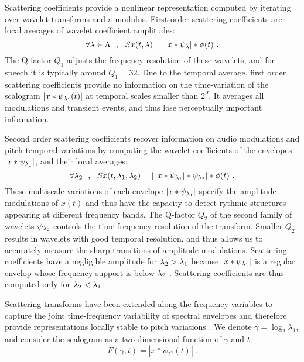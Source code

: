 Scattering coefficients provide a nonlinear representation 
computed by 
iterating over wavelet transforms and a modulus. 
First order scattering coefficients
are local averages of wavelet coefficient amplitudes:
\[
\forall {\lambda} \in {\Lambda}~~,~~S x(t,{\lambda}) = |\, x \ast \psi_{\lambda}| \ast \phi(t)~. 
\]
The Q-factor $Q_1$ adjusts the frequency resolution of 
these wavelets, and for speech it is typically around $Q_1=32$.
 Due to the temporal average, first order scattering coefficients 
provide no information on the time-variation of the scalogram
$|x \ast \psi_{{\lambda}_1} (t)|$ at temporal scales smaller than $2^J$. 
It averages all modulations and 
transient events, and thus lose perceptually important information.
 
Second order scattering coefficients recover information on
audio modulations and pitch temporal variations by computing
the wavelet coefficients of the envelopes $|x \ast \psi_{{\lambda}_1}|$, and their
local averages:
\[
\forall {\lambda}_2~~,~~
S x(t,{\lambda}_1,{\lambda}_2) = ||\, x \ast \psi_{{\lambda}_1}| \ast \psi_{{\lambda}_2}| \ast \phi(t)~ .
\]
These multiscale variations of each envelope $|x \ast \psi_{{\lambda}_1}|$ 
specify the amplitude modulations of $x(t)$ \cite{deepscatt} and 
thus have the capacity to detect rythmic structures appearing at different 
frequency bands. 
The Q-factor $Q_2$ of the second family of wavelets $\psi_{{\lambda}_2}$ 
controls the time-frequency resolution of the transform. Smaller $Q_2$ 
results in wavelets with good temporal resolution, and thus
allows us to accurately measure the sharp transitions of
amplitude modulations. 
Scattering coefficients have a negligible amplitude for
${\lambda}_2 > {\lambda}_1$ because $|x \ast \psi_{{\lambda}_1}|$ is a regular envelop
whose frequency support is below ${\lambda}_2$ \cite{pami}. 
Scattering coefficients are thus computed only for ${\lambda}_2 < {\lambda}_1$. 

%
%
%
%
Scattering transforms have been extended along the frequency
variables to capture the joint time-frequency 
variability of spectral envelopes and therefore provide 
 representations locally stable to pitch variations \cite{deepscatt}. 
We denote $\gamma = \log_2 \lambda_1$, and consider
the scalogram as a two-dimensional function of $\gamma$ and $t$: 
\[
F (\gamma, t) = |x \ast \psi_{2^{\gamma}} (t)|~.
\]

